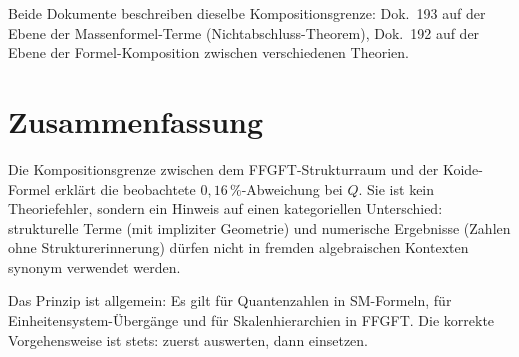 Beide Dokumente beschreiben dieselbe Kompositionsgrenze:
Dok.~193 auf der Ebene der Massenformel-Terme (Nichtabschluss-Theorem),
Dok.~192 auf der Ebene der Formel-Komposition zwischen verschiedenen Theorien.

\section*{Zusammenfassung}

Die Kompositionsgrenze zwischen dem FFGFT-Strukturraum und der
Koide-Formel erklärt die beobachtete $0{,}16\,\%$-Abweichung bei $Q$.
Sie ist kein Theoriefehler, sondern ein Hinweis auf einen kategoriellen
Unterschied: strukturelle Terme (mit impliziter Geometrie) und numerische
Ergebnisse (Zahlen ohne Strukturerinnerung) dürfen nicht in fremden
algebraischen Kontexten synonym verwendet werden.

Das Prinzip ist allgemein: Es gilt für Quantenzahlen in SM-Formeln,
für Einheitensystem-Übergänge und für Skalenhierarchien in FFGFT.
Die korrekte Vorgehensweise ist stets: zuerst auswerten, dann einsetzen.
